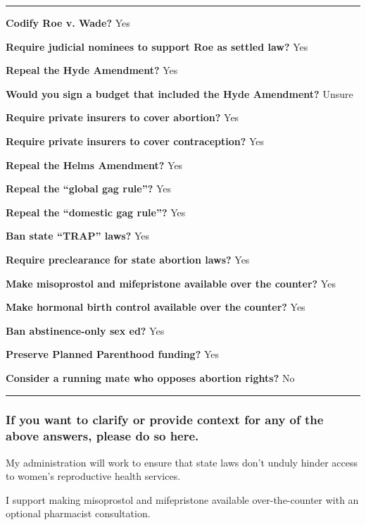 \begin{center}\rule{0.5\linewidth}{\linethickness}\end{center}

\textbf{Codify Roe v. Wade?} Yes

\textbf{Require judicial nominees to support Roe as settled law?} Yes

\textbf{Repeal the Hyde Amendment?} Yes

\textbf{Would you sign a budget that included the Hyde Amendment?}
Unsure

\textbf{Require private insurers to cover abortion?} Yes

\textbf{Require private insurers to cover contraception?} Yes

\textbf{Repeal the Helms Amendment?} Yes

\textbf{Repeal the ``global gag rule''?} Yes

\textbf{Repeal the ``domestic gag rule''?} Yes

\textbf{Ban state ``TRAP'' laws?} Yes

\textbf{Require preclearance for state abortion laws?} Yes

\textbf{Make misoprostol and mifepristone available over the counter?}
Yes

\textbf{Make hormonal birth control available over the counter?} Yes

\textbf{Ban abstinence-only sex ed?} Yes

\textbf{Preserve Planned Parenthood funding?} Yes

\textbf{Consider a running mate who opposes abortion rights?} No

\begin{center}\rule{0.5\linewidth}{\linethickness}\end{center}

\hypertarget{if-you-want-to-clarify-or-provide-context-for-any-of-the-above-answers-please-do-so-here}{%
\subsubsection{If you want to clarify or provide context for any of the
above answers, please do so
here.}\label{if-you-want-to-clarify-or-provide-context-for-any-of-the-above-answers-please-do-so-here}}

My administration will work to ensure that state laws don't unduly
hinder access to women's reproductive health services.

I support making misoprostol and mifepristone available over-the-counter
with an optional pharmacist consultation.

